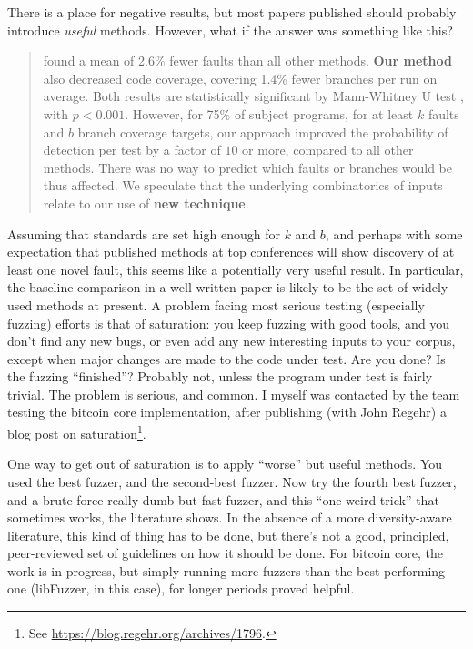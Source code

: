 \documentclass[sigplan,screen]{acmart}
\begin{document}
There is a place for negative results, but most papers published
should probably introduce \emph{useful} methods.  However, what if the
answer was something like this?

\begin{quote}
 found a mean of 2.6\% fewer faults than all
other methods.  {\bf Our
  method} also decreased code coverage, covering 1.4\% fewer branches
per run on average.  Both results are statistically significant by
Mann-Whitney U test \cite{arcuri2014hitchhiker}, with $p < 0.001$.
However, for 75\% of subject programs, for at least $k$ faults and $b$
branch coverage targets, our approach improved the probability of
detection per test by a factor of $10$ or more, compared to all other
methods.  There was no way to predict which faults or branches would
be thus affected.  We speculate that the underlying combinatorics of
inputs relate to our use of {\bf new technique}.
\end{quote}

Assuming that standards are set high enough for $k$ and $b$, and
perhaps with some expectation that published methods at top
conferences will show discovery of at least one novel fault, this
seems like a potentially very useful result.  In particular, the
baseline comparison in a well-written paper is likely to be the set of
widely-used methods at present.  A problem facing most serious testing
(especially fuzzing) efforts is that of saturation:  you keep fuzzing
with good tools, and you don't find any new bugs, or even add any new
interesting inputs to your corpus, except when major changes are made
to the code under test.  Are you done?  Is the fuzzing ``finished''?
Probably not, unless the program under test is fairly trivial.  The
problem is serious, and common.  I myself was contacted by the team
testing the bitcoin core implementation, after publishing (with John
Regehr) a blog post
on saturation\footnote{See
  \url{https://blog.regehr.org/archives/1796}.}.

One way to get out of saturation is to apply ``worse'' but useful
methods.  You used the best fuzzer, and the second-best fuzzer.  Now
try the fourth best fuzzer, and a brute-force really dumb but fast
fuzzer, and this ``one weird trick'' that sometimes works, the
literature shows.  In the absence of a more diversity-aware
literature, this kind of thing has to be done, but there's not a good,
principled, peer-reviewed set of guidelines on how it should be done.
For bitcoin core, the work is in progress, but simply running more
fuzzers than the best-performing one (libFuzzer, in this case), for
longer periods proved helpful.
\end{document}
